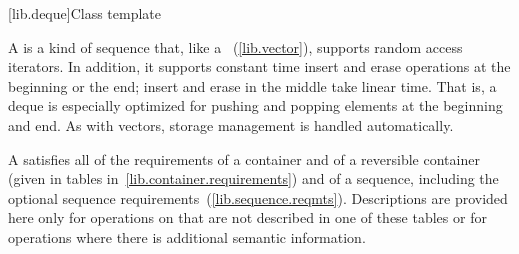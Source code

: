 [lib.deque]{Class template }

\pnum
A
%
is a kind of sequence that, like a
~(\ref{lib.vector}), supports random access iterators.
In addition, it supports constant time insert and erase operations at the beginning or the end;
insert and erase in the middle take linear time.
That is, a deque is especially optimized for pushing and popping elements at the beginning and end.
As with vectors, storage management is handled automatically.

\pnum
A
satisfies all of the requirements of a container and of a reversible container
(given in tables in~\ref{lib.container.requirements}) and of a sequence,
including the optional sequence requirements~(\ref{lib.sequence.reqmts}).
Descriptions are provided here only for operations on
that are not described in one of these tables
or for operations where there is additional semantic information.

